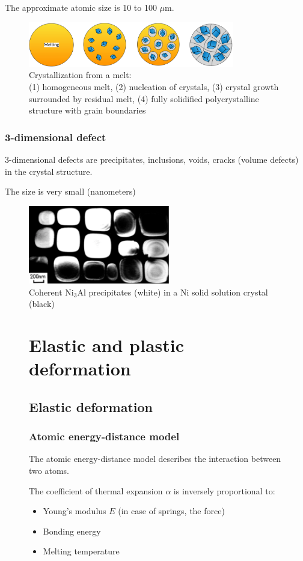 \documentclass{article}
\begin{document}
The approximate atomic size is 10 to 100 $\mu$m.

\begin{figure}[ht!]
  \centering
  \includegraphics[width=0.8\textwidth]{media/lattice_2d.png}
  \caption*{Crystallization from a melt:\\(1) homogeneous melt, (2) nucleation of crystals, (3) crystal growth surrounded by residual melt, (4) fully solidified polycrystalline structure with grain boundaries}
\end{figure}

\subsubsection{3-dimensional defect}
3-dimensional defects are precipitates, inclusions, voids, cracks (volume defects) in the crystal structure.

The size is very small (nanometers)
\begin{figure}[ht!]
  \centering
  \includegraphics[width=0.55\textwidth]{media/lattice_3d.png}
  \caption*{Coherent Ni$_3$Al precipitates (white) in a Ni solid solution crystal (black)}
\end{figure}

\newpage
\begin{figure}
  \section{Elastic and plastic deformation}
  \subsection{Elastic deformation}
  \subsubsection{Atomic energy-distance model}
  The atomic energy-distance model describes the interaction between two atoms.

  The coefficient of thermal expansion $\alpha$ is inversely proportional to:
  \begin{itemize}
    \item Young's modulus $E$ (in case of springs, the force)
    \item Bonding energy
    \item Melting temperature
  \end{itemize}
\end{figure}
\end{document}
